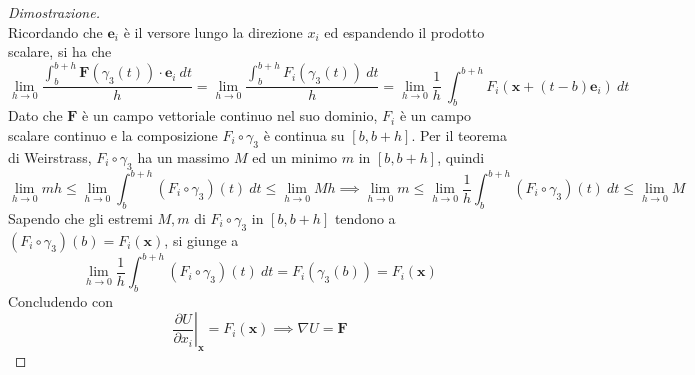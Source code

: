 \documentclass{article}
\begin{document}
\begin{proof}[Dimostrazione]
\[                \]
                Ricordando che $\mathbf{e}_{i}$ è il versore lungo la direzione $x_i$ ed espandendo il prodotto scalare, si ha che
                \[
                    \lim_{h \rightarrow 0} \frac{\displaystyle \int_{b}^{b+h} \mathbf{F}(\gamma_3(t)) \cdot \mathbf{e}_{i} \: dt}{h} = \lim_{h \rightarrow 0} \frac{\displaystyle \int_{b}^{b+h} F_{i}(\gamma_3(t)) \: dt}{h} = \lim_{h \rightarrow 0} \frac{1}{h} \: \int_{b}^{b+h}  F_{i}(\mathbf{x} + (t - b)\mathbf{e}_{i}) \: dt
                \]
                Dato che $\mathbf{F}$ è un campo vettoriale continuo nel suo dominio, $F_{i}$ è un campo scalare continuo e la composizione $F_{i} \circ \gamma_{3}$ è continua su $[b, b + h]$.
                Per il teorema di Weirstrass, $F_{i} \circ \gamma_{3}$ ha un massimo $M$ ed un minimo $m$ in $[b, b+h]$, quindi
                \[
                    \lim_{h \rightarrow 0} mh \leq \lim_{h \rightarrow 0} \int_{b}^{b+h} (F_{i} \circ \gamma_{3})(t) \: dt \leq \lim_{h \rightarrow 0} Mh \implies \lim_{h \rightarrow 0} m \leq \lim_{h \rightarrow 0} \frac{1}{h} \int_{b}^{b+h} (F_{i} \circ \gamma_{3})(t) \: dt \leq \lim_{h \rightarrow 0} M
                \]
                Sapendo che gli estremi $M, m$ di $F_{i} \circ \gamma_{3}$ in $[b, b+h]$ tendono a $(F_{i} \circ \gamma_{3})(b) = F_{i}(\mathbf{x})$, si giunge a
                \[
                    \lim_{h \rightarrow 0} \frac{1}{h} \int_{b}^{b+h} (F_{i} \circ \gamma_{3})(t) \: dt = F_{i}(\gamma_{3}(b)) = F_{i}(\mathbf{x})
                \]
                Concludendo con
                \[
                    \left. \frac{\partial U}{\partial x_{i}} \right|_{\mathbf{x}} = F_{i}(\mathbf{x}) \implies \nabla U = \mathbf{F}
                \]
                

\end{proof}
\end{document}
